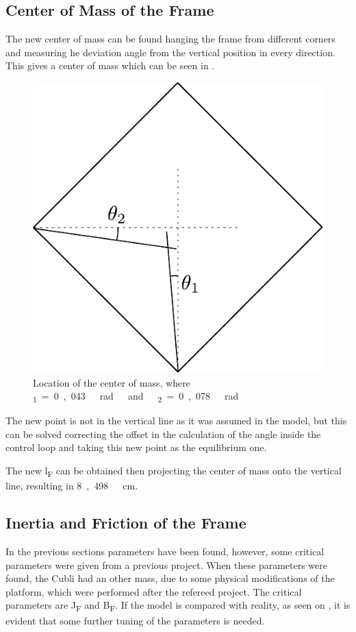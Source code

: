 \subsection{Center of Mass of the Frame}
The new center of mass can be found hanging the frame from different corners and measuring he deviation angle from the vertical position in every direction. This gives a center of mass which can be seen in . 
\begin{figure}[H]
	\centering
	\includegraphics[scale=0.6]{figures/centerOfMassDiagram}
	\caption{Location of the center of mass, where \si{\theta_1=0,043\ rad\ and\ \theta_2=0,078\ rad}}
	\label{centerOfMassDiagram}
\end{figure}


The new point is not in the vertical line as it was assumed in the model, but this can be solved correcting the offset in the calculation of the angle inside the control loop and taking this new point as the equilibrium one. 

The new \si{l_F} can be obtained then projecting the center of mass onto the vertical line, resulting in \si{8,498\ cm}.

\subsection{Inertia and Friction of the Frame}
In the previous sections parameters have been found, however, some critical parameters were given from a previous project. When these parameters were found, the Cubli had an other mass, due to some physical modifications of the platform, which were performed after the refereed project. The critical parameters are \si{J_F} and \si{B_F}. If the model is compared with reality, as seen on , it is evident that some further tuning of the parameters is needed.

